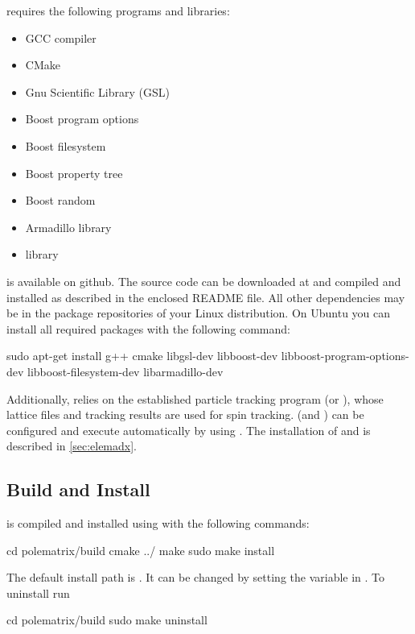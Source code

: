 \documentclass[a4paper]{scrartcl}
\begin{document}
\polem requires the following programs and libraries:
\begin{multicols}{2}
\begin{itemize}
\item GCC compiler
\item CMake
\item Gnu Scientific Library (GSL) \cite{gsl}
\item Boost program options
\item Boost filesystem
\item Boost property tree %
\item Boost random %
\item Armadillo library \cite{arma}
\item \pal library \cite{palattice}
\end{itemize}
\end{multicols}
\pal is available on github. The source code can be downloaded at \cite{palattice} and
compiled and installed as described in the enclosed README file.
%
All other dependencies may be in the package repositories of your Linux distribution. On
Ubuntu you can install all required packages with the following command:
\begin{bashcode}
  sudo apt-get install g++ cmake libgsl-dev libboost-dev libboost-program-options-dev libboost-filesystem-dev libarmadillo-dev
\end{bashcode}
Additionally, \polem relies on the established particle
tracking program \ele (or \madx), whose lattice files and tracking results are used for
spin tracking.  \ele (and \madx) can be configured and execute automatically by \polem using
\pal. The installation of \ele and \madx is described in \cref{sec:elemadx}.


    
\subsection{Build and Install \polem}
\label{sec:build}
\polem is compiled and installed using  with the following commands:
\begin{bashcode}
  cd polematrix/build
  cmake ../
  make
  sudo make install
\end{bashcode}
The default install path is . It can be changed by setting the
 variable in .
%
To uninstall \polem run
\begin{bashcode}
  cd polematrix/build
  sudo make uninstall
\end{bashcode}
\end{document}

